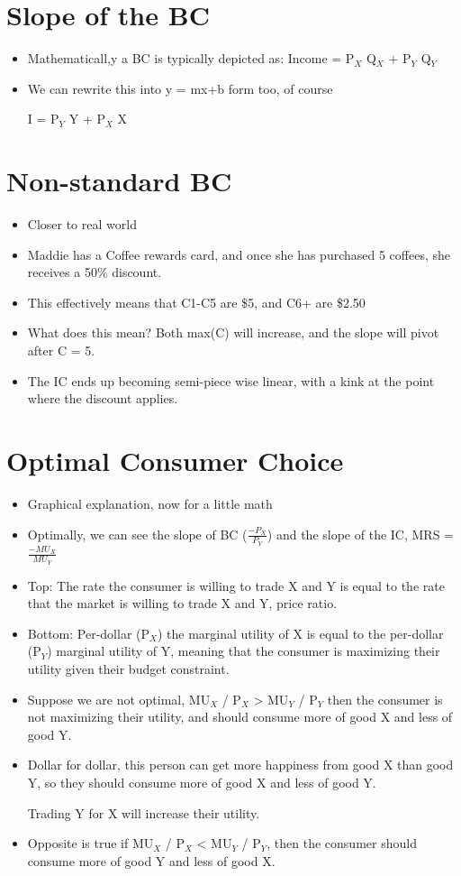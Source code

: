\documentclass{article}
\begin{document}
\section*{Slope of the BC}
\begin{itemize}
  \item Mathematicall,y a BC is typically depicted as:
    Income = P$_X$ \times Q$_X$ + P$_Y$ \times Q$_Y$
  \item We can rewrite this into y = mx+b form too, of course

    I = P$_Y$ \times Y + P$_X$ \times X
\end{itemize}


\section*{Non-standard BC}
\begin{itemize}
  \item Closer to real world
  \item Maddie has a Coffee rewards card, and once she has purchased 5 coffees,
    she receives a 50\% discount.
  \item This effectively means that C1-C5 are \$5, and C6+ are \$2.50
  \item What does this mean? Both max(C) will increase, and the slope will
    pivot after C = 5.
  \item The IC ends up becoming semi-piece wise linear,
    with a kink at the point where the discount applies.
\end{itemize}

\section*{Optimal Consumer Choice}
\begin{itemize}
  \item Graphical explanation, now for a little math
  \item Optimally, we can see the slope of BC ($\frac{-P_X}{P_Y}$)
    and the slope of the IC, MRS = $\frac{-MU_X}{MU_Y}$
  \item Top: The rate the consumer is willing to trade X and Y is equal to
    the rate that the market is willing to trade X and Y, price ratio.
  \item Bottom: Per-dollar (P$_X$) the marginal utility of X is equal to the per-dollar (P$_Y$)
    marginal utility of Y, meaning that the consumer is maximizing their utility
    given their budget constraint.
  \item Suppose we are not optimal, MU$_X$ / P$_X$ > MU$_Y$ / P$_Y$
    then the consumer is not maximizing their utility, and should consume more of good X
    and less of good Y.
  \item Dollar for dollar, this person can get more happiness from good X than good Y,
    so they should consume more of good X and less of good Y.

    Trading Y for X will increase their utility.
  \item Opposite is true if MU$_X$ / P$_X$ < MU$_Y$ / P$_Y$,
    then the consumer should consume more of good Y and less of good X.
\end{itemize}
\end{document}

